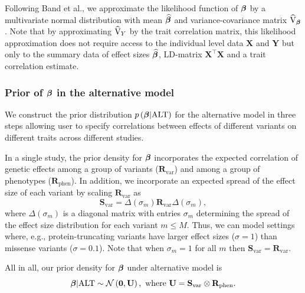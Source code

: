 Following Band et al.\cite{band2013imputation}, we approximate the likelihood function of $\boldsymbol {\beta}$ by a multivariate normal distribution with mean $\boldsymbol {\widehat{\beta}}$ and variance-covariance matrix $\widehat{\textrm{V}}_{\boldsymbol {\beta}}$. Note that by approximating $\widehat{\textrm{V}}_Y$ by the trait correlation matrix, this likelihood approximation does not require access to the individual level data $\mathbf{\textrm{X}}$ and $\mathbf{\textrm{Y}}$ but only to the 
summary data of effect sizes $\boldsymbol {\widehat{\beta}}$, LD-matrix $\mathbf{\textrm{X}}^\intercal\mathbf{\textrm{X}}$ and a trait correlation estimate.


\subsubsection*{Prior of $\boldsymbol{\beta}$ in the alternative model} 
\label{prioralt}
We construct the prior distribution $p\left({\boldsymbol {\beta}} | \textrm{ALT} \right)$ for the alternative model in three steps allowing 
user to specify correlations between effects of different variants on different traits across different studies.

In a single study, the prior density for ${\boldsymbol {\beta}}$ incorporates the expected correlation of genetic effects among 
a group of variants ($\mathbf{R}_{\textrm{var}}$) and among a group of phenotypes ($\mathbf{R}_{\textrm{phen}}$). 
In addition, we  incorporate an expected spread of the effect size of each variant by scaling $\mathbf{R}_{\textrm{var}}$ as 
$$\mathbf{S}_{\textrm{var}} = \Delta\left(\sigma_m\right) \mathbf{R}_{\textrm{var}} \Delta\left(\sigma_m\right),$$
where $\Delta\left(\sigma_m\right)$ is a diagonal matrix with entries $\sigma_m$ determining the spread of the effect size distribution for each variant $m \leq M$. Thus, we can model settings where, e.g., protein-truncating variants have larger effect sizes ($\sigma = 1$) than missense variants ($\sigma = 0.1$). 
Note that when $\sigma_m = 1$ for all $m$ then $\mathbf{S}_{\textrm{var}} = \mathbf{R}_{\textrm{var}}$. 

All in all, our prior density for ${\boldsymbol \beta}$ under alternative model is 
$${\boldsymbol {\beta}}|\textrm{ALT} \sim \mathcal{N}\left(\mathbf{0}, \mathbf{U}\right), \textrm{ where } \mathbf{U} = \mathbf{S}_{\textrm{var}} \otimes \mathbf{R}_{\textrm{phen}}.$$

